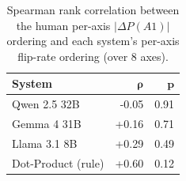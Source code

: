 \begin{table}[H]
\centering\small
\caption{Spearman rank correlation between the human per-axis $|\Delta P(A1)|$ ordering and each system's per-axis flip-rate ordering (over 8 axes).}
\label{tab:spearman_human_vs_llm}
\begin{tabular}{lrr}
\toprule
\textbf{System} & $\bm{\rho}$ & $\bm{p}$ \\
\midrule
Qwen 2.5 32B           & -0.05 & 0.91 \\
Gemma 4 31B            & +0.16 & 0.71 \\
Llama 3.1 8B           & +0.29 & 0.49 \\
Dot-Product (rule)     & +0.60 & 0.12 \\
\bottomrule
\end{tabular}
\end{table}
